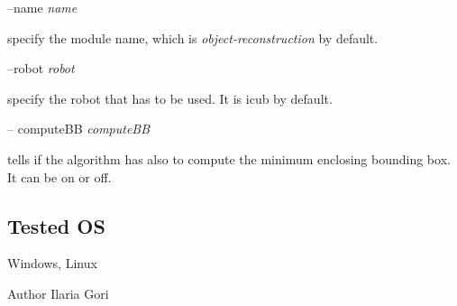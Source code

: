 --name {\itshape name} 
\begin{DoxyItemize}
\item specify the module name, which is {\itshape object-\/reconstruction} by default.
\end{DoxyItemize}

--robot {\itshape robot} 
\begin{DoxyItemize}
\item specify the robot that has to be used. It is icub by default.
\end{DoxyItemize}

-- compute\+B\+B {\itshape compute\+B\+B} 
\begin{DoxyItemize}
\item tells if the algorithm has also to compute the minimum enclosing bounding box. It can be on or off.
\end{DoxyItemize}\hypertarget{group__handIKModule_tested_os_sec}{}\subsection{Tested O\+S}\label{group__handIKModule_tested_os_sec}
Windows, Linux

\begin{DoxyAuthor}{Author}
Ilaria Gori 
\end{DoxyAuthor}
